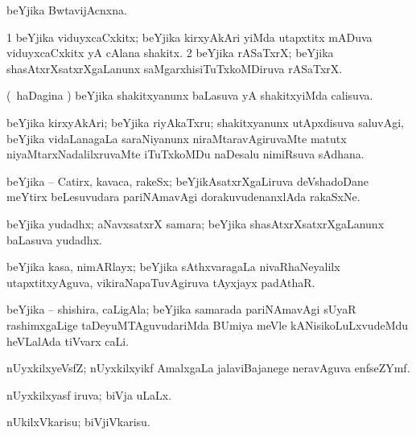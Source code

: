 \bentry
{}
\gl{\nA}
\bmng
beYjika BwtavijAcnxna. 
\emng
\eentry

\bentry
{}
\gl{\nA}
\bmng
\bnum
\num{1} beYjika viduyxcaCxkitx; beYjika kirxyAkAri yiMda utapxtitx mADuva viduyxcaCxkitx yA cAlana shakitx. 
\num{2} beYjika rASaTxrX; beYjika shasAtxrXsatxrXgaLanunx saMgarxhisiTuTxkoMDiruva rASaTxrX. 
\enum
\emng
\eentry

\bentry
{}
\gl{\gu}
\bmng
(\kanmu\ haDagina \vi) beYjika shakitxyanunx baLasuva yA shakitxyiMda calisuva. 
\emng
\eentry

\bentry
{}
\gl{\nA}
\bmng
beYjika kirxyAkAri; beYjika riyAkaTxru; shakitxyanunx utApxdisuva saluvAgi, beYjika vidaLanagaLa saraNiyanunx niraMtaravAgiruvaMte matutx niyaMtarxNadalilxruvaMte iTuTxkoMDu naDesalu nimiRsuva sAdhana. 
\emng
\eentry

\bentry
{}
\gl{\nA}
\bmng
beYjika -- Catirx, kavaca, rakeSx; beYjikAsatxrXgaLiruva deVshadoDane meYtirx beLesuvudara pariNAmavAgi dorakuvudenanxlAda rakaSxNe. 
\emng
\eentry

\bentry
{}
\gl{\nA}
\bmng
beYjika yudadhx; aNavxsatxrX samara; beYjika shasAtxrXsatxrXgaLanunx baLasuva yudadhx. 
\emng
\eentry

\bentry
{}
\gl{\nA}
\bmng
beYjika kasa, nimARlayx; beYjika sAthxvaragaLa nivaRhaNeyalilx utapxtitxyAguva, vikiraNapaTuvAgiruva tAyxjayx padAthaR. 
\emng
\eentry

\bentry
{}
\gl{\nA}
\bmng
beYjika -- shishira, caLigAla; beYjika samarada pariNAmavAgi sUyaR rashimxgaLige taDeyuMTAguvudariMda BUmiya meVle kANisikoLuLxvudeMdu heVLalAda tiVvarx caLi. 
\emng
\eentry

\bentry
{}
\gl{\nA}
\bmng
nUyxkilxyeVsfZ; nUyxkilxyikf AmalxgaLa jalaviBajanege neravAguva enfseZYmf. 
\emng
\eentry

\bentry
{}
\gl{\gu}
\bmng
nUyxkilxyasf iruva; biVja uLaLx. 
\emng
\eentry

\bentry
{}
\gl{\sakirx}
\bmng
nUkilxVkarisu; biVjiVkarisu. 
\emng

